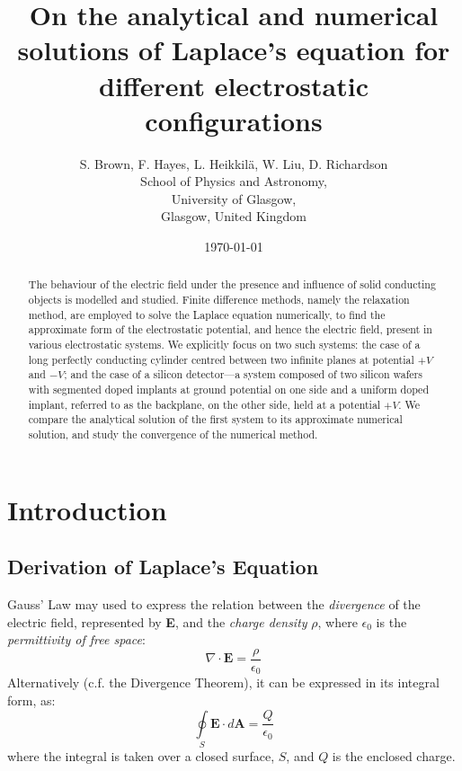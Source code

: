\documentclass[12pt, a4paper]{article}
\newcommand{\be}{\begin{equation}}
\newcommand{\ee}{\end{equation}}
\begin{document}
\title{On the analytical and numerical solutions of Laplace's equation for different electrostatic configurations}
\author{S. Brown, F. Hayes, L. Heikkil{\"a}, W. Liu, D. Richardson\\
	School of Physics and Astronomy,\\
	University of Glasgow,\\
	Glasgow, United Kingdom}
\date{\today}
\maketitle

\begin{abstract}

The behaviour of the electric field under the presence and influence of solid
conducting objects is modelled and studied. Finite difference methods, namely the
relaxation method, are employed to solve the Laplace equation numerically,
to find the approximate form of the electrostatic potential, and hence the electric
field, present in various electrostatic systems. We explicitly focus on two such
systems: the case of a long perfectly conducting cylinder centred between two infinite
planes at potential $+V$ and $-V$; and the case of a silicon detector---a system
composed of two silicon wafers with segmented doped implants at ground potential on one
side and a uniform doped implant, referred to as the backplane, on the other side, held
at a potential $+V$. We compare the analytical solution of the first system to its
approximate numerical solution, and study the convergence of the numerical method.

\end{abstract} %

\section{Introduction}
\subsection{Derivation of Laplace's Equation}

Gauss' Law may used to express the relation between the \emph{divergence} of the
electric field, represented by \textbf{E}, and the \emph{charge density} $\rho$,
where $\epsilon_0$ is the \emph{permittivity of free space}:
%
\be
\nabla \cdot \bm{E} = \frac{\rho}{\epsilon_0}
\ee
%
Alternatively (c.f. the Divergence Theorem), it can be expressed in its
integral form, as:
%
\be
\oint \limits_S \bm{E} \cdot d\bm{A} = \frac{Q}{\epsilon_0}
\ee
%
where the integral is taken over a closed surface, $S$, and $Q$ is the enclosed charge.
\end{document}

